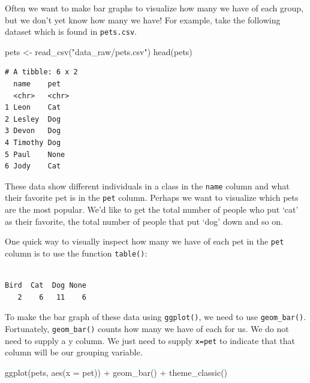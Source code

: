 \documentclass[
  letterpaper,
  DIV=11,
  numbers=noendperiod]{scrreprt}
\newenvironment{Shaded}{\begin{snugshade}}{\end{snugshade}}
\newcommand{\AttributeTok}[1]{\textcolor[rgb]{0.40,0.45,0.13}{#1}}
\newcommand{\FunctionTok}[1]{\textcolor[rgb]{0.28,0.35,0.67}{#1}}
\newcommand{\NormalTok}[1]{\textcolor[rgb]{0.00,0.23,0.31}{#1}}
\newcommand{\OtherTok}[1]{\textcolor[rgb]{0.00,0.23,0.31}{#1}}
\newcommand{\SpecialCharTok}[1]{\textcolor[rgb]{0.37,0.37,0.37}{#1}}
\newcommand{\StringTok}[1]{\textcolor[rgb]{0.13,0.47,0.30}{#1}}
\begin{document}
Often we want to make bar graphs to visualize how many we have of each
group, but we don't yet know how many we have! For example, take the
following dataset which is found in \texttt{pets.csv}.

\begin{Shaded}
\begin{Highlighting}[]
\NormalTok{pets }\OtherTok{\textless{}{-}} \FunctionTok{read\_csv}\NormalTok{(}\StringTok{"data\_raw/pets.csv"}\NormalTok{)}
\FunctionTok{head}\NormalTok{(pets)}
\end{Highlighting}
\end{Shaded}

\begin{verbatim}
# A tibble: 6 x 2
  name    pet  
  <chr>   <chr>
1 Leon    Cat  
2 Lesley  Dog  
3 Devon   Dog  
4 Timothy Dog  
5 Paul    None 
6 Jody    Cat  
\end{verbatim}

These data show different individuals in a class in the \texttt{name}
column and what their favorite pet is in the \texttt{pet} column.
Perhaps we want to visualize which pets are the most popular. We'd like
to get the total number of people who put `cat' as their favorite, the
total number of people that put `dog' down and so on.

One quick way to visually inspect how many we have of each pet in the
\texttt{pet} column is to use the function \texttt{table()}:

\begin{Shaded}
\end{Shaded}

\begin{verbatim}

Bird  Cat  Dog None 
   2    6   11    6 
\end{verbatim}

To make the bar graph of these data using \texttt{ggplot()}, we need to
use \texttt{geom\_bar()}. Fortunately, \texttt{geom\_bar()} counts how
many we have of each for us. We do not need to supply a y column. We
just need to supply \texttt{x=pet} to indicate that that column will be
our grouping variable.

\begin{Shaded}
\begin{Highlighting}[]
\FunctionTok{ggplot}\NormalTok{(pets, }\FunctionTok{aes}\NormalTok{(}\AttributeTok{x =}\NormalTok{ pet)) }\SpecialCharTok{+} 
  \FunctionTok{geom\_bar}\NormalTok{() }\SpecialCharTok{+}
  \FunctionTok{theme\_classic}\NormalTok{()}
\end{Highlighting}
\end{Shaded}
\end{document}
